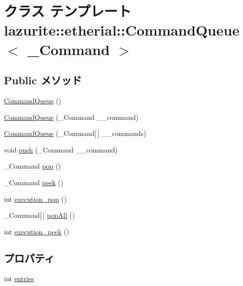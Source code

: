 \hypertarget{classlazurite_1_1etherial_1_1_command_queue_3_01___command_01_4}{
\section{クラス テンプレート lazurite::etherial::CommandQueue$<$ \_\-Command $>$}
\label{classlazurite_1_1etherial_1_1_command_queue_3_01___command_01_4}
}
\subsection*{Public メソッド}
\begin{DoxyCompactItemize}
\item 
\hyperlink{classlazurite_1_1etherial_1_1_command_queue_3_01___command_01_4_af98c1d5ddaa57b05950cedb16ae2e6b0}{CommandQueue} ()
\item 
\hyperlink{classlazurite_1_1etherial_1_1_command_queue_3_01___command_01_4_aba0ecac621350efb2d73d04cf16a9f36}{CommandQueue} (\_\-Command \_\-\_\-command)
\item 
\hyperlink{classlazurite_1_1etherial_1_1_command_queue_3_01___command_01_4_a16dc85d35c80526592aea0c03962f7ac}{CommandQueue} (\_\-Command\mbox{[}$\,$\mbox{]} \_\-\_\-commands)
\item 
void \hyperlink{classlazurite_1_1etherial_1_1_command_queue_3_01___command_01_4_a89d41ddb410fd25b3e0e7155d364b09c}{push} (\_\-Command \_\-\_\-command)
\item 
\_\-Command \hyperlink{classlazurite_1_1etherial_1_1_command_queue_3_01___command_01_4_a8467677d37f0282b96ec871f7eedb66d}{pop} ()
\item 
\_\-Command \hyperlink{classlazurite_1_1etherial_1_1_command_queue_3_01___command_01_4_a931227fc5def14ac815a5474dd3f10b7}{peek} ()
\item 
int \hyperlink{classlazurite_1_1etherial_1_1_command_queue_3_01___command_01_4_a92848fc92ee4741d05bcd96f39f23524}{execution\_\-pop} ()
\item 
\_\-Command\mbox{[}$\,$\mbox{]} \hyperlink{classlazurite_1_1etherial_1_1_command_queue_3_01___command_01_4_a14bef7e5ebd9c06839a48e9bd5c0cbca}{popAll} ()
\item 
int \hyperlink{classlazurite_1_1etherial_1_1_command_queue_3_01___command_01_4_a71d8c3a5843c744cbc52a0e7728a3524}{execution\_\-peek} ()
\end{DoxyCompactItemize}
\subsection*{プロパティ}
\begin{DoxyCompactItemize}
\item 
int \hyperlink{classlazurite_1_1etherial_1_1_command_queue_3_01___command_01_4_a03b2406d483ebbdfdced30c44e5c3265}{entries}
\end{DoxyCompactItemize}


